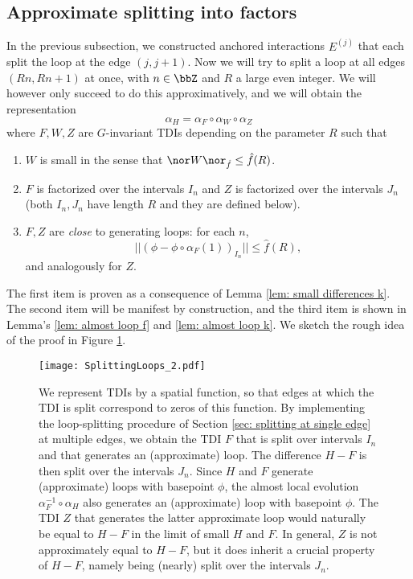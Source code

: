 \subsection{Approximate splitting into factors}\label{sec: approximate splitting}



In the previous subsection, we constructed anchored interactions $E^{(j)}$ that each split the loop at the edge $(j,j+1)$. 
Now we will try to split a loop at all edges $(Rn,Rn+1)$ at once, with  $n\in \bbZ$ and $R$ a large even integer.  We will however only succeed to do this approximatively, and we will obtain the representation
$$
\alpha_H=   \alpha_{F} \circ  \alpha_{W} \circ \alpha_Z
$$ 
where $F,W,Z$ are $G$-invariant TDIs depending on the parameter $R$ such that
\begin{enumerate}
	\item $W$ is small in the sense that $\nor W \nor_{\hat{f}}\leq \hat{f}(R)$.
	\item $F$ is factorized over the intervals $I_n$  and $Z$ is factorized over the intervals $J_n$ (both $I_n,J_n$ have length $R$ and they are defined below).
	\item $F,Z$ are \emph{close} to generating loops: for each $n$, 
	$$||(\phi-\phi\circ\alpha_{F}(1))_{I_n}|| \leq \hat{f}(R), $$
	and analogously for $Z$.
\end{enumerate}
The first item is proven as a consequence of Lemma \ref{lem: small differences k}. The second item will be manifest by construction, and the third item is shown in 
Lemma's \ref{lem: almost loop f} and \ref{lem: almost loop k}.
We sketch the rough idea of the proof in Figure \ref{fig: handf}. 
\begin{figure}[h]
	\begin{center}
		\texttt{[image: SplittingLoops\_2.pdf]}
		\caption{We represent TDIs by a spatial function, so that edges at which the TDI is split correspond to zeros of this function.  By implementing the loop-splitting procedure of Section \ref{sec: splitting at single edge} at multiple edges, we obtain the TDI $F$ that is split over intervals $I_n$ and that generates an (approximate) loop.  The difference $H-F$ is then split over the intervals $J_n$.
			Since $H$ and $F$ generate (approximate) loops with basepoint $\phi$, the almost local evolution $\alpha_F^{-1}\circ\alpha_H$ also generates an (approximate) loop with basepoint $\phi$. 
			The TDI $Z$ that generates the latter approximate loop would naturally be equal to $H-F$ in the limit of small $H$ and $F$. In general, $Z$ is not approximately equal to $H-F$, but it does inherit a crucial property of $H-F$, namely being (nearly) split over the intervals $J_n$. } 
		\label{fig: handf}
	\end{center}
\end{figure}
%


